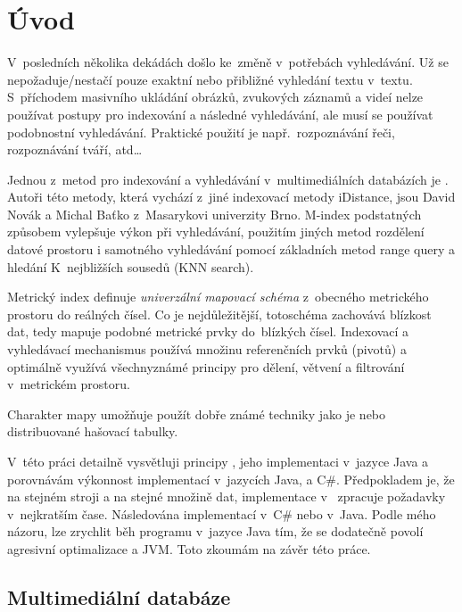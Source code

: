 \chapter{Úvod}

V~posledních několika dekádách došlo ke~změně v~potřebách vyhledávání.
Už se nepožaduje/nestačí pouze exaktní nebo přibližné vyhledání textu
v~textu. S~příchodem masivního ukládání obrázků, zvukových záznamů
a videí nelze používat  postupy pro indexování a následné
vyhledávání, ale musí se používat podobnostní vyhledávání. Praktické
použití je např.~rozpoznávání řeči, rozpoznávání tváří, atd\ldots{}

Jednou z~metod pro indexování a vyhledávání v~multimediálních databázích
je \MIndex{}\cite{Novak:2009:MIE:1637863.1638184}\@. Autoři této
metody, která vychází z~jiné indexovací metody iDistance\cite{Jagadish:2005:IAB:1071610.1071612},
jsou David Novák a Michal Baťko z~Masarykovi univerzity Brno\@.
M-index podstatných způsobem vylepšuje výkon při vyhledávání, použitím
jiných metod rozdělení datové prostoru i samotného vyhledávání pomocí
základních metod range query a hledání K~nejbližších sousedů (KNN
search)\@.

Metrický index definuje \emph{univerzální mapovací schéma} z~obecného metrického prostoru do reálných čísel.
Co je nejdůležitější, totoschéma zachovává blízkost dat, tedy mapuje podobné metrické prvky do~blízkých čísel.
Indexovací a vyhledávací mechanismus  používá množinu referenčních prvků (pivotů) a optimálně využívá všechnyznámé principy pro dělení, větvení a filtrování v~metrickém prostoru.

Charakter mapy  umožňuje použít dobře známé techniky jako je \BPTree\cite{Cormen:2001:IA:580470} nebo distribuované hašovací tabulky.

V~této práci detailně vysvětluji principy , jeho implementaci
v~jazyce Java a porovnávám výkonnost implementací \MIndex{} v~jazycích
Java, \CC{} a C\#. Předpokladem je, že na stejném stroji a na stejné
množině dat, implementace v~\CC{} zpracuje požadavky v~nejkratším
čase. Následována implementací v~C\# nebo v~Java. Podle mého názoru,
lze zrychlit běh programu v~jazyce Java tím, že se dodatečně povolí
agresivní optimalizace a  JVM. Toto zkoumám na závěr této práce.

\section{Multimediální databáze}

